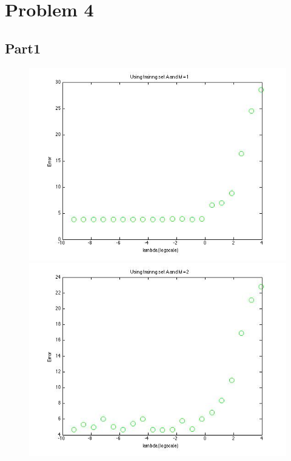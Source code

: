 \section{Problem 4}

\subsection{Part1}


\begin{figure}[!htb]

  \includegraphics[width=\linewidth]{figures/p4_LAD_regressA_m=1}
\endminipage\hfill
{}
  \includegraphics[width=\linewidth]{figures/p4_LAD_regressA_m=2}
\endminipage\hfill
\end{figure}


